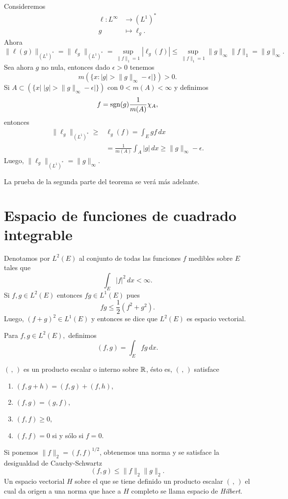 \begin{demo}
Consideremos
\[
\begin{split}
\ell:L^{\infty}  & \longrightarrow (L^1)^*
\\
g & \longmapsto \ell_g.
\end{split}
\]
Ahora 
\[
\|\ell(g)\|_{(L^1)^*}=\|\ell_g\|_{(L^1)^*}=
\sup\limits_{\|f\|_1 =1} |\ell_g(f)| \leq 
\sup \limits_{\|f\|_1=1} \|g\|_{\infty} \|f\|_1 =\|g\|_{\infty}.
\]
Sea ahora $g$ no nula, entonces dado $\epsilon>0$ tenemos
\[
m\left(\{x: |g|>\|g\|_{\infty}-\epsilon|  \}\right)>0.
\]
Si $A \subset \left(\{x \big|\; |g|>\|g\|_{\infty}-\epsilon|  \}\right)$
con $0<m(A)<\infty$ y definimos 
\[
f=\operatorname{sgn}(g) \frac{1}{m(A)} \chi_A,
\]
entonces
\[
\begin{split}
    \|\ell_g\|_{(L^1)^*} \geq& \ell_g(f)=\int_E gf\,dx 
    \\
    &= \frac{1}{m(A)} \int_A |g|\,dx\geq \|g\|_{\infty}-\epsilon.
\end{split}
\]
Luego, $\|\ell_g\|_{(L^1)^*}=\|g\|_{\infty}$.

La prueba de la segunda parte del teorema se ver\'a m\'as adelante.
\end{demo}

\section{Espacio de funciones de cuadrado integrable}

Denotamos por $L^2(E)$ al conjunto de todas las funciones $f$ medibles sobre $E$ tales que 
\[ 
\int_E |f|^2\,dx <\infty.
\]
Si $f,g \in L^2(E)$ entonces $fg \in  L^1(E)$ pues
\[
fg \leq \frac{1}{2}\left(f^2+g^2\right).
\]
Luego, $(f+g)^2 \in L^1(E)$ y entonces se dice que $L^2(E)$ es espacio vectorial. 

Para $f,g\in L^2(E),$ definimos 
\[
(f,g)=\int_E fg\,dx.
\]

$(\, ,\, )$ es un producto escalar o interno sobre $\mathbb{R}$, \'esto es, 
$(\, ,\, )$ satisface
\begin{enumerate}
    \item $(f,g+h)=(f,g)+(f,h)$,
    \item $(f,g)=(g,f)$,
    \item $(f,f)\geq 0$,
    \item $(f,f)=0$ si y s\'olo si $f=0$.
\end{enumerate}

Si ponemos $\|f\|_2=(f,f)^{1/2}$, obtenemos una norma y se satisface la desigualdad de Cauchy-Schwartz
\[
(f,g)\leq \| f \|_2\|g\|_2.
\]
Un espacio vectorial $H$ sobre el que se tiene definido un producto escalar $(\, ,\, )$ el cual da origen a una norma que hace a $H$ completo se llama espacio de \emph{Hilbert}.

